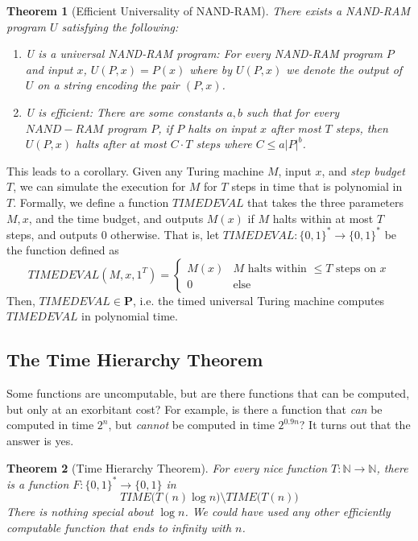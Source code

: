 \documentclass[a4paper, 12pt]{report}
\newtheorem{theorem}{Theorem}[section]
\theoremstyle{remark}
\theoremstyle{definition}
\begin{document}
\begin{theorem}[Efficient Universality of NAND-RAM]
There exists a NAND-RAM program $U$ satisfying the following: 
\begin{enumerate}
    \item \textit{U is a universal NAND-RAM program}: For every NAND-RAM program $P$ and input $x$, $U(P, x) = P(x)$ where by $U(P, x)$ we denote the output of $U$ on a string encoding the pair $(P, x)$. 
    \item \textit{U is efficient}: There are some constants $a, b$ such that for every $NAND-RAM$ program $P$, if $P$ halts on input $x$ after most $T$ steps, then $U(P, x)$ halts after at most $C \cdot T$ steps where $C \leq a |P|^b$. 
\end{enumerate}
\end{theorem}

This leads to a corollary. Given any Turing machine $M$, input $x$, and \textit{step budget} $T$, we can simulate the execution for $M$ for $T$ steps in time that is polynomial in $T$. Formally, we define a function $TIMEDEVAL$ that takes the three parameters $M, x$, and the time budget, and outputs $M(x)$ if $M$ halts within at most $T$ steps, and outputs $0$ otherwise. That is, let $TIMEDEVAL: \{0,1\}^* \longrightarrow \{0,1\}^*$ be the function defined as 
\[TIMEDEVAL (M, x, 1^T) = \begin{cases}
M(x) & M \text{ halts within } \leq T \text{ steps on } x \\
0 & \text{else}
\end{cases}\]
Then, $TIMEDEVAL \in \mathbf{P}$, i.e. the timed universal Turing machine computes $TIMEDEVAL$ in polynomial time. 

\subsection{The Time Hierarchy Theorem}
Some functions are uncomputable, but are there functions that can be computed, but only at an exorbitant cost? For example, is there a function that \textit{can} be computed in time $2^n$, but \textit{cannot} be computed in time $2^{0.9 n}$? It turns out that the answer is yes. 

\begin{theorem}[Time Hierarchy Theorem]
For every nice function $T: \mathbb{N} \longrightarrow \mathbb{N}$, there is a function $F: \{0,1\}^* \longrightarrow \{0,1\}$ in 
\[TIME \big( T(n) \log n\big) \setminus TIME \big( T(n)\big) \]
There is nothing special about $\log n$. We could have used any other efficiently computable function that ends to infinity with $n$. 
\end{theorem}
\end{document}
